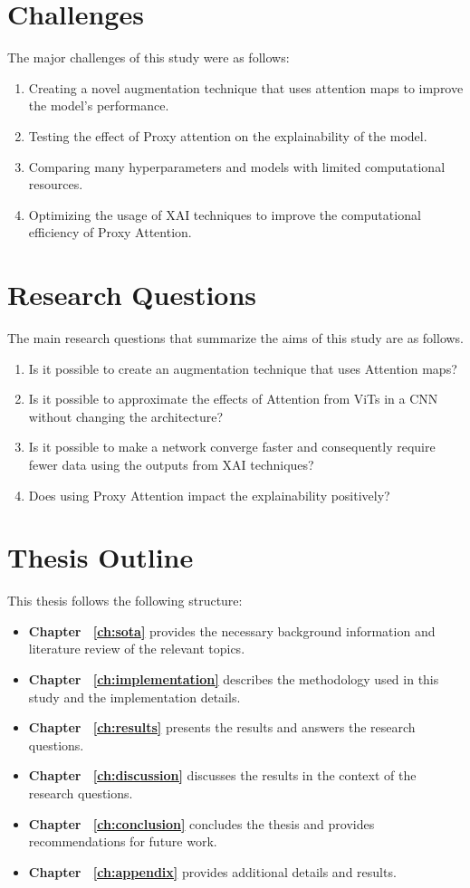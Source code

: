 \section{Challenges}
The major challenges of this study were as follows:
\begin{enumerate}
    \item Creating a novel augmentation technique that uses attention maps to improve the model's performance.
    \item Testing the effect of Proxy attention on the explainability of the model.
    \item Comparing many hyperparameters and models with limited computational resources.
    \item Optimizing the usage of XAI techniques to improve the computational efficiency of Proxy Attention.
\end{enumerate}

\section{Research Questions} \label{section:researchq}
The main research questions that summarize the aims of this study are as follows.
\begin{enumerate}
    \item Is it possible to create an augmentation technique that uses Attention maps?
    \item Is it possible to approximate the effects of Attention from ViTs in a CNN without changing the architecture?
    \item Is it possible to make a network converge faster and consequently require fewer data using the outputs from XAI techniques?
    \item Does using Proxy Attention impact the explainability positively?
\end{enumerate}
\section{Thesis Outline}
This thesis follows the following structure:
\begin{itemize}
    \item \textbf{Chapter ~\ref{ch:sota}} provides the necessary background information and literature review of the relevant topics.
    \item \textbf{Chapter ~\ref{ch:implementation}} describes the methodology used in this study and the implementation details.
    \item \textbf{Chapter ~\ref{ch:results}} presents the results and answers the research questions.
    \item \textbf{Chapter ~\ref{ch:discussion}} discusses the results in the context of the research questions.
    \item \textbf{Chapter ~\ref{ch:conclusion}} concludes the thesis and provides recommendations for future work.
    \item \textbf{Chapter ~\ref{ch:appendix}} provides additional details and results.
\end{itemize}

